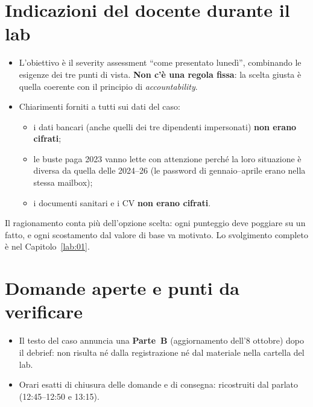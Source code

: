 \section{Indicazioni del docente durante il lab}
\begin{itemize}
  \item L'obiettivo è il severity assessment ``come presentato lunedì'', combinando le esigenze dei
    tre punti di vista. \textbf{Non c'è una regola fissa}: la scelta giusta è quella coerente con il
    principio di \emph{accountability}.
  \item Chiarimenti forniti a tutti sui dati del caso:
    \begin{itemize}
      \item i dati bancari (anche quelli dei tre dipendenti impersonati) \textbf{non erano cifrati};
      \item le buste paga 2023 vanno lette con attenzione perché la loro situazione è diversa da
        quella delle 2024--26 (le password di gennaio--aprile erano nella stessa mailbox);
      \item i documenti sanitari e i CV \textbf{non erano cifrati}.
    \end{itemize}
\end{itemize}

\begin{esame}
Il ragionamento conta più dell'opzione scelta: ogni punteggio deve poggiare su un fatto, e ogni
scostamento dal valore di base va motivato. Lo svolgimento completo è nel Capitolo~\ref{lab:01}.
\end{esame}

\section{Domande aperte e punti da verificare}
\begin{verifica}
\begin{itemize}
  \item Il testo del caso annuncia una \textbf{Parte~B} (aggiornamento dell'8 ottobre) dopo il
    debrief: non risulta né dalla registrazione né dal materiale nella cartella del lab.
  \item Orari esatti di chiusura delle domande e di consegna: ricostruiti dal parlato (12:45--12:50 e
    13:15).
\end{itemize}
\end{verifica}
